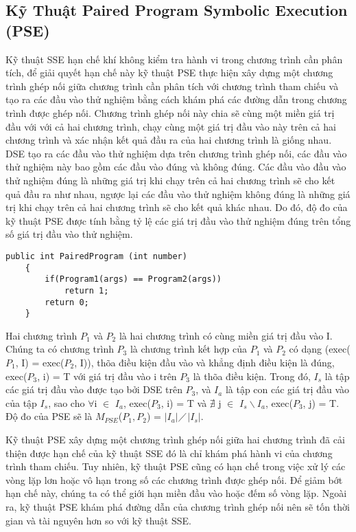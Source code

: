 \subsection{Kỹ Thuật Paired Program Symbolic Execution (PSE)}
Kỹ thuật SSE hạn chế khí không kiểm tra hành vi trong chương trình cần phân tích, để giải quyết hạn chế này kỹ thuật PSE thực hiện xây dựng một chương trình ghép nối giữa chương trình cần phân tích với chương trình tham chiếu và tạo ra các đầu vào thử nghiệm bằng cách khám phá các đường dẫn trong chương trình được ghép nối. Chương trình ghép nối này chia sẽ cùng một miền giá trị đầu với với cả hai chương trình, chạy cùng một giá trị đầu vào này trên cả hai chương trình và xác nhận kết quả đầu ra của hai chương trình là giống nhau. DSE tạo ra các đầu vào thử nghiệm dựa trên chương trình ghép nối, các đầu vào thử nghiệm này bao gồm các đầu vào đúng và không đúng. Các đầu vào đầu vào thử nghiệm đúng là những giá trị khi chạy trên cả hai chương trình sẽ cho kết quả đầu ra như nhau, ngược lại các đầu vào thử nghiệm không đúng là những giá trị khi chạy trên cả hai chương trình sẽ cho kết quả khác nhau. Do đó, độ đo của kỹ thuật PSE được tính bằng tỷ lệ các giá trị đầu vào thử nghiệm đúng trên tổng số giá trị đầu vào thử nghiệm. 

\begin{lstlisting}[caption={Chương trình ghép nối $P_{}$}, label={Script}]
	public int PairedProgram (int number)
	{
		if(Program1(args) == Program2(args))
			return 1;
		return 0;
	}
\end{lstlisting}

\begin{definition}
  Hai chương trình $P_{1}$ và $P_{2}$ là hai chương trình có cùng miền
  giá trị đầu vào I. Chúng ta có chương trình $P_{3}$ là chương trình
  kết hợp của $P_{1}$ và $P_{2}$ có dạng (exec($P_{1}$, I) =
  exec($P_{2}$, I)), thõa điều kiện đầu vào và khẳng định điều kiện là
  đúng, exec($P_{3}$, i) = T với giá trị đầu vào i trên $P_{3}$ là
  thõa điều kiện. Trong đó, $I_{s}$ là tập các giá trị đầu vào được
  tạo bởi DSE trên $P_{3}$, và $I_{a}$ là tập con các giá trị đầu vào
  của tập $I_{s}$, sao cho $\forall$i $\in$ $I_{a}$, exec($P_{3}$, i)
  = T và $\nexists $ j $\in$ $I_{s} \backslash I_{a}$, exec($P_{3}$,
  j) = T. Độ đo của PSE sẽ là $M_{PSE}$($P_{1},P_{2}$) =
  $\left|I_{a}\right|$$\diagup$$\left|I_{s}\right|$.
\end{definition}

Kỹ thuật PSE xây dựng một chương trình ghép nối giữa hai chương trình đã cải thiện được hạn chế của kỹ thuật SSE đó là chỉ khám phá hành vi của chương trình tham chiếu. Tuy nhiên, kỹ thuật PSE cũng có hạn chế trong việc xử lý các vòng lặp lơn hoặc vô hạn trong số các chương trình được ghép nối. Để giảm bớt hạn chế này, chúng ta có thể giới hạn miền đầu vào hoặc đếm số vòng lặp. Ngoài ra, kỹ thuật PSE khám phá đường dẫn của chương trình ghép nối nên sẽ tốn thời gian và tài nguyên hơn so với kỹ thuật SSE.

